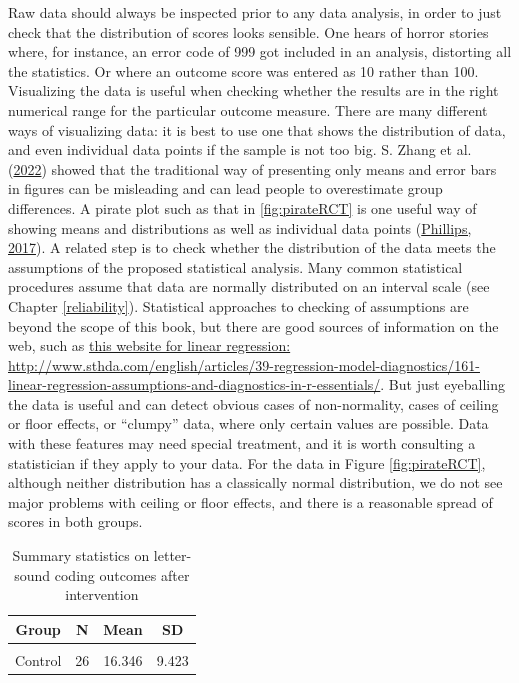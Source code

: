 \documentclass{krantz}
\begin{document}
Raw data should always be inspected prior to any data analysis, in order to just check that the distribution of scores looks sensible. One hears of horror stories where, for instance, an error code of 999 got included in an analysis, distorting all the statistics. Or where an outcome score was entered as 10 rather than 100. Visualizing the data is useful when checking whether the results are in the right numerical range for the particular outcome measure. There are many different ways of visualizing data: it is best to use one that shows the distribution of data, and even individual data points if the sample is not too big. S. Zhang et al. (\protect\hyperlink{ref-zhang2022}{2022}) showed that the traditional way of presenting only means and error bars in figures can be misleading and can lead people to overestimate group differences.
A pirate plot such as that in \ref{fig:pirateRCT} is one useful way of showing means and distributions as well as individual data points (\protect\hyperlink{ref-phillips2017}{Phillips, 2017}).
A related step is to check whether the distribution of the data meets the assumptions of the proposed statistical analysis. Many common statistical procedures assume that data are normally distributed on an interval scale (see Chapter \ref{reliability}). Statistical approaches to checking of assumptions are beyond the scope of this book, but there are good sources of information on the web, such as \href{http://www.sthda.com/english/articles/39-regression-model-diagnostics/161-linear-regression-assumptions-and-diagnostics-in-r-essentials/}{this website for linear regression: http://www.sthda.com/english/articles/39-regression-model-diagnostics/161-linear-regression-assumptions-and-diagnostics-in-r-essentials/}. But just eyeballing the data is useful and can detect obvious cases of non-normality, cases of ceiling or floor effects, or ``clumpy'' data, where only certain values are possible. Data with these features may need special treatment, and it is worth consulting a statistician if they apply to your data. For the data in Figure \ref{fig:pirateRCT}, although neither distribution has a classically normal distribution, we do not see major problems with ceiling or floor effects, and there is a reasonable spread of scores in both groups.

\begin{table}

\caption{\label{tab:table2gp}Summary statistics on letter-sound coding outcomes after intervention}
\centering
\begin{tabular}[t]{cccc}
\toprule
Group & N & Mean & SD\\
\midrule
\cellcolor{gray!6}{Intervention} & \cellcolor{gray!6}{28} & \cellcolor{gray!6}{22.286} & \cellcolor{gray!6}{7.282}\\
Control & 26 & 16.346 & 9.423\\
\bottomrule
\end{tabular}
\end{table}
\end{document}
